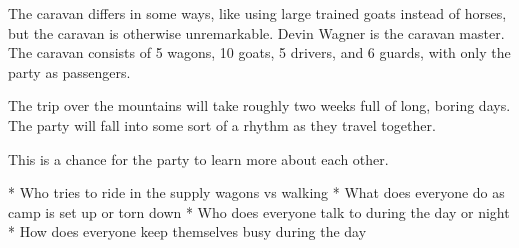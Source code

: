 The caravan differs in some ways, like using large trained goats instead of horses, but the caravan is otherwise unremarkable.
Devin Wagner is the caravan master.
The caravan consists of 5 wagons, 10 goats, 5 drivers, and 6 guards, with only the party as passengers.

The trip over the mountains will take roughly two weeks full of long, boring days.
The party will fall into some sort of a rhythm as they travel together.

This is a chance for the party to learn more about each other.

* Who tries to ride in the supply wagons vs walking
* What does everyone do as camp is set up or torn down
* Who does everyone talk to during the day or night
* How does everyone keep themselves busy during the day
